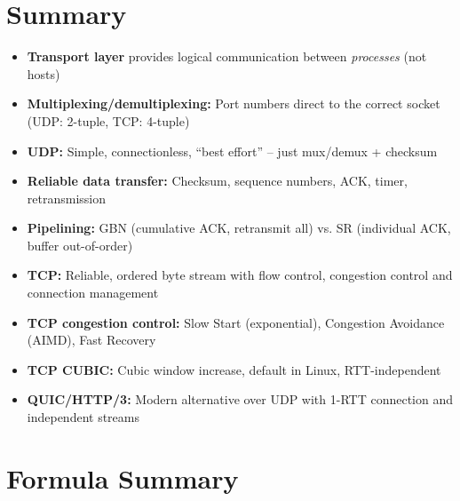 \section{Summary}

\begin{keybox}
\begin{itemize}[noitemsep]
    \item \textbf{Transport layer} provides logical communication between \emph{processes} (not hosts)
    \item \textbf{Multiplexing/demultiplexing:} Port numbers direct to the correct socket (UDP: 2-tuple, TCP: 4-tuple)
    \item \textbf{UDP:} Simple, connectionless, ``best effort'' -- just mux/demux + checksum
    \item \textbf{Reliable data transfer:} Checksum, sequence numbers, ACK, timer, retransmission
    \item \textbf{Pipelining:} GBN (cumulative ACK, retransmit all) vs. SR (individual ACK, buffer out-of-order)
    \item \textbf{TCP:} Reliable, ordered byte stream with flow control, congestion control and connection management
    \item \textbf{TCP congestion control:} Slow Start (exponential), Congestion Avoidance (AIMD), Fast Recovery
    \item \textbf{TCP CUBIC:} Cubic window increase, default in Linux, RTT-independent
    \item \textbf{QUIC/HTTP/3:} Modern alternative over UDP with 1-RTT connection and independent streams
\end{itemize}
\end{keybox}

\section*{Formula Summary}

